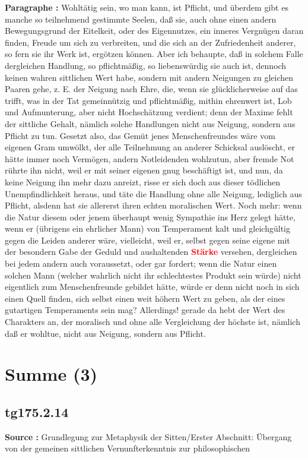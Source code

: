\documentclass[a4paper,12pt,twoside]{book}
\newcommand{\match}[1]{\textcolor{red}{\textbf{#1}}}
\newcommand{\unnumberedsection}[1]{
	\section*{#1}
	\addcontentsline{toc}{section}{#1}
	\markright{#1}
}
\begin{document}
	\noindent\textbf{Paragraphe : }
	Wohltätig sein, wo man kann, ist Pflicht, und überdem gibt es manche so teilnehmend gestimmte Seelen, daß sie, auch ohne einen andern Bewegungsgrund der Eitelkeit, oder des Eigennutzes, ein inneres Vergnügen daran finden, Freude um sich zu verbreiten, und die sich an der Zufriedenheit anderer, so fern sie ihr Werk ist, ergötzen können. Aber ich behaupte, daß in solchem Falle dergleichen Handlung, so pflichtmäßig, so liebenswürdig sie auch ist, dennoch keinen wahren sittlichen Wert habe, sondern mit andern Neigungen zu gleichen Paaren gehe, z. E. der Neigung nach Ehre, die, wenn sie glücklicherweise auf das trifft, was in der Tat gemeinnützig und pflichtmäßig, mithin ehrenwert ist, Lob und Aufmunterung, aber nicht Hochschätzung verdient; denn der Maxime fehlt der sittliche Gehalt, nämlich solche Handlungen nicht aus Neigung, sondern aus Pflicht zu tun. Gesetzt also, das Gemüt jenes Menschenfreundes wäre vom eigenen Gram umwölkt, der alle Teilnehmung an anderer Schicksal auslöscht, er hätte immer noch Vermögen, andern Notleidenden wohlzutun, aber fremde Not rührte ihn nicht, weil er mit seiner eigenen gnug beschäftigt ist, und nun, da keine Neigung ihn mehr dazu anreizt, risse er sich doch aus dieser tödlichen Unempfindlichkeit heraus, und täte die Handlung ohne alle Neigung, lediglich aus Pflicht, alsdenn hat sie allererst ihren echten moralischen Wert. Noch mehr: wenn die Natur diesem oder jenem überhaupt wenig Sympathie ins Herz gelegt hätte, wenn er (übrigens ein ehrlicher Mann) von Temperament kalt und gleichgültig gegen die Leiden anderer wäre, vielleicht, weil er, selbst gegen seine eigene mit der besondern Gabe der Geduld und aushaltenden \match{Stärke} versehen, dergleichen bei jedem andern auch voraussetzt, oder gar fordert; wenn die Natur einen solchen Mann (welcher wahrlich nicht ihr schlechtestes Produkt sein würde) nicht eigentlich zum Menschenfreunde gebildet hätte, würde er denn nicht noch in sich einen Quell finden, sich selbst einen weit höhern Wert zu geben, als der eines gutartigen Temperaments sein mag? Allerdings! gerade da hebt der Wert des Charakters an, der  moralisch und ohne alle Vergleichung der höchste ist, nämlich daß er wohltue, nicht aus Neigung, sondern aus Pflicht. 
	
	\unnumberedsection{Summe (3)} 
	\subsection*{tg175.2.14} 
	\textbf{Source : }Grundlegung zur Metaphysik der Sitten/Erster Abschnitt: Übergang von der gemeinen sittlichen Vernunfterkenntnis zur philosophischen\\  
	
\end{document}
